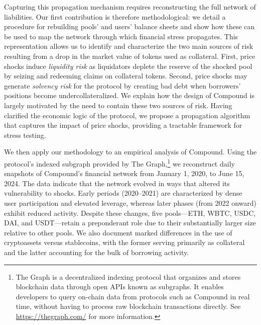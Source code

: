 \documentclass[a4paper,UKenglish,cleveref, autoref, thm-restate]{informs3}
\DeclareRobustCommand{\latestrev}[1]{{\color{red}\hypersetup{linkcolor=red,citecolor=red,urlcolor=red}#1}}
\begin{document}
Capturing this propagation mechanism requires reconstructing the full network of liabilities. Our first contribution is therefore methodological: we detail a procedure for rebuilding pools' and users' balance sheets and show how these can be used to map the network through which financial stress propagates. This representation allows us to identify and characterize the two main sources of risk resulting from a drop in the market value of tokens used as collateral. First, price shocks induce \textit{liquidity risk} as liquidators deplete the reserve of the shocked pool by \latestrev{seizing and redeeming claims on collateral tokens}. Second, price shocks may generate \textit{solvency risk} for the protocol by creating bad debt when borrowers' positions become undercollateralized. We explain how the design of Compound is largely motivated by the need to contain these two sources of risk. Having clarified the economic logic of the protocol, we propose a propagation algorithm that captures the impact of price shocks, providing a tractable framework for stress testing.

We then apply our methodology to an empirical analysis of Compound. Using the protocol’s indexed subgraph provided by The Graph,\footnote{The Graph is a decentralized indexing protocol that organizes and stores blockchain data through open APIs known as subgraphs. It enables 
developers to query on-chain data from protocols such as Compound in real time, without having to process raw blockchain transactions directly. See \url{https://thegraph.com/} for more information.} we reconstruct daily snapshots of Compound’s financial network from January 1, 2020, to June 15, 2024. The data indicate that the network evolved in ways that altered its vulnerability to shocks. Early periods (2020–2021) are characterized by dense user participation and elevated leverage, whereas later phases (from 2022 onward) exhibit reduced activity. Despite these changes, five pools—ETH, WBTC, USDC, DAI, and USDT—retain a preponderant role due to their substantially larger size relative to other pools. We also document marked differences in the use of cryptoassets versus stablecoins, with the former serving primarily as collateral and the latter accounting for the bulk of borrowing activity.
\end{document}
